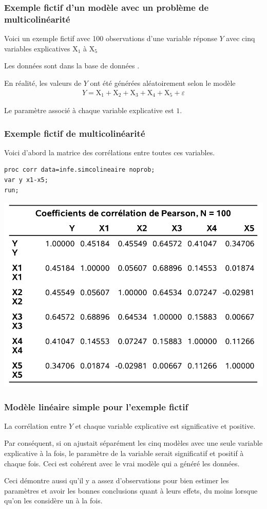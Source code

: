 \documentclass[xcolor={dvipsnames}]{beamer}
\begin{document}
\begin{frame}
\frametitle{Exemple fictif d'un modèle avec un problème de multicolinéarité}
\bi
\item Voici un exemple fictif avec 100 observations d'une variable réponse 
$Y$ avec cinq variables explicatives  $\mathrm{X}_1$ à $\mathrm{X}_5$
\item Les données sont dans la base de données .
\item  En réalité, les valeurs de $Y$ ont été générées aléatoirement selon le modèle
\begin{align*}
Y=\mathrm{X}_1+\mathrm{X}_2+\mathrm{X}_3+\mathrm{X}_4+\mathrm{X}_5+\varepsilon
\end{align*}
\item Le paramètre associé à chaque variable explicative est $1$.
\ei
\end{frame}

\begin{frame}[fragile]
\frametitle{Exemple fictif de multicolinéarité}
Voici d'abord la matrice des corrélations entre toutes ces variables.
\begin{tcolorbox}[colback=white,colframe=hecblue,title=code \SASlang pour la corrélation]
\begin{verbatim}
proc corr data=infe.simcolineaire noprob;
var y x1-x5;
run;
\end{verbatim}
\end{tcolorbox}
\begin{center}
\includegraphics[width= 0.6\linewidth]{img/c2/diapos3-e24}
\end{center}

\end{frame}

\begin{frame}[fragile]
\frametitle{Modèle linéaire simple pour l'exemple fictif}
\bi
\item La corrélation entre $Y$ et chaque variable explicative est significative et
positive. 
\item Par conséquent, si on ajustait séparément les cinq modèles avec une
seule variable explicative à la fois, le paramètre de la variable serait significatif
et positif à chaque fois. Ceci est cohérent avec le vrai modèle qui a généré les
données. 
\item Ceci démontre aussi qu'il y a assez d'observations pour bien estimer
les paramètres et avoir les bonnes conclusions quant à leurs effets, du moins
lorsque qu'on les considère un à la fois.
\ei
\end{frame}
\end{document}

